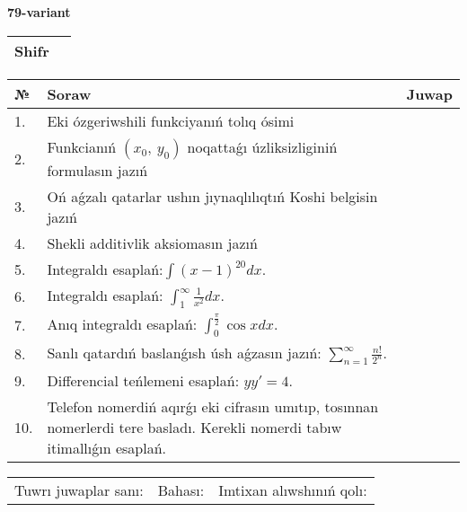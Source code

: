 \documentclass{article}
\begin{document}
  \egroup
  
  \newpage
  
  
  \textbf{79-variant}\\
  
  \bgroup
  \def\arraystretch{1.6} %
  
  \begin{tabular}{|m{5.7cm}|m{9.5cm}|}
  \hline
  Shifr & \\
  \hline
  \end{tabular}
  
  \vspace{1cm}
  
  \begin{tabular}{|m{0.7cm}|m{10cm}|m{4cm}|}
  \hline
  № & Soraw & Juwap \\
  \hline
  1. & Eki ózgeriwshili funkciyanıń tolıq ósimi &  \\
  \hline
  2. & Funkcianıń \((x_{0},\ y_{0})\) noqattaǵı úzliksizliginiń formulasın jazıń &  \\
  \hline
  3. & Oń aǵzalı qatarlar ushın jıynaqlılıqtıń Koshi belgisin jazıń &  \\
  \hline
  4. & Shekli additivlik aksiomasın jazıń &  \\
  \hline
  5. & Integraldı esaplań:\(\int{(x - 1)^{20}}dx\). &  \\
  \hline
  6. & Integraldı esaplań: \(\int_{1}^{\infty}{\frac{1}{x^2 }dx}\). &  \\
  \hline
  7. & Anıq integraldı esaplań: \(\int_{0}^{\frac{\pi}{2}}{\cos xdx}\). &  \\
  \hline
  8. & Sanlı qatardıń baslanǵısh úsh aǵzasın jazıń: \(\sum_{n = 1}^{\infty}\frac{n!}{2^{n}}\). &  \\
  \hline
  9. & Differencial teńlemeni esaplań: \(yy' = 4\). &  \\
  \hline
  10. & Telefon nomerdiń aqırǵı eki cifrasın umıtıp, tosınnan nomerlerdi tere basladı. Kerekli nomerdi tabıw itimallıǵın esaplań. &  \\
  \hline
  \end{tabular}
  
  \vspace{1cm}
  
  \begin{tabular}{lll}
  Tuwrı juwaplar sanı: \underline{\hspace{1.5cm}} & 
  Bahası: \underline{\hspace{1.5cm}} & 
  Imtixan alıwshınıń qolı: \underline{\hspace{2cm}} \\
  \end{tabular}
  
\end{document}
